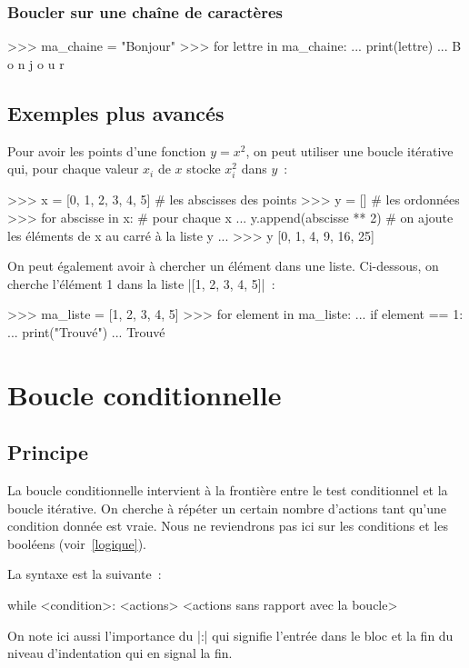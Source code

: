 		\subsubsection{Boucler sur une chaîne de caractères}
		\begin{pythoncode}
			>>> ma_chaine = "Bonjour"
			>>> for lettre in ma_chaine:
			... 	print(lettre)
			...
			B
			o
			n
			j
			o
			u
			r
		\end{pythoncode}
	
	\subsection{Exemples plus avancés}
		
		Pour avoir les points d'une fonction $y = x^2$, on peut utiliser une boucle itérative qui, pour chaque valeur $x_i$ de $x$ stocke $x_i^2$ dans $y$~:
		\begin{pythoncode}
			>>> x = [0, 1, 2, 3, 4, 5] # les abscisses des points
			>>> y = [] # les ordonnées
			>>> for abscisse in x: # pour chaque x
			... 	y.append(abscisse ** 2) # on ajoute les éléments de x au carré à la liste y
			...
			>>> y
			[0, 1, 4, 9, 16, 25]
		\end{pythoncode}
		
		On peut également avoir à chercher un élément dans une liste. Ci-dessous, on cherche l'élément 1 dans la liste \python|[1, 2, 3, 4, 5]|~:
		\begin{pythoncode}
			>>> ma_liste = [1, 2, 3, 4, 5]
			>>> for element in ma_liste:
			... 	if element == 1:
			... 		print("Trouvé")
			...
			Trouvé
		\end{pythoncode}

\section{Boucle conditionnelle}
	
	\subsection{Principe}
	
		La boucle conditionnelle intervient à la frontière entre le test conditionnel et la boucle itérative.
		On cherche à répéter un certain nombre d'actions tant qu'une condition donnée est vraie. Nous ne reviendrons pas ici sur les conditions et les booléens (voir~\ref{logique}).
		
		La syntaxe est la suivante~:
		\begin{pythoncode}
			while <condition>:
				<actions>
			<actions sans rapport avec la boucle>
		\end{pythoncode}
		On note ici aussi l'importance du \python|:| qui signifie l'entrée dans le bloc et la fin du niveau d'indentation qui en signal la fin.
	
